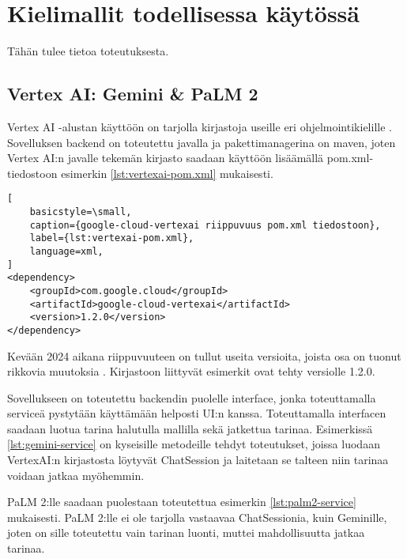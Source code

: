 \chapter{Kielimallit todellisessa käytössä}%
\label{ch:toteutus}

Tähän tulee tietoa toteutuksesta.

\section{Vertex AI: Gemini \& PaLM 2}

Vertex AI -alustan käyttöön on tarjolla kirjastoja useille eri
ohjelmointikielille \parencite{vertexAiGenerativeAiQuickstart}. Sovelluksen
backend on toteutettu javalla ja pakettimanagerina on maven, joten Vertex AI:n
javalle tekemän kirjasto saadaan käyttöön lisäämällä pom.xml-tiedostoon
esimerkin \ref{lst:vertexai-pom.xml} mukaisesti.

\begin{lstlisting}[
    basicstyle=\small,
    caption={google-cloud-vertexai riippuvuus pom.xml tiedostoon},
    label={lst:vertexai-pom.xml},
    language=xml,
]
<dependency>
    <groupId>com.google.cloud</groupId>
    <artifactId>google-cloud-vertexai</artifactId>
    <version>1.2.0</version>
</dependency>
\end{lstlisting}

Kevään 2024 aikana riippuvuuteen on tullut useita versioita, joista osa on
tuonut rikkovia muutoksia \parencite{mavenGoogleVertexAIAPI}. Kirjastoon
liittyvät esimerkit ovat tehty versiolle 1.2.0.

Sovellukseen on toteutettu backendin puolelle interface, jonka toteuttamalla
serviceä pystytään käyttämään helposti UI:n kanssa. Toteuttamalla interfacen
saadaan luotua tarina halutulla mallilla sekä jatkettua tarinaa. Esimerkissä
\ref{lst:gemini-service} on kyseisille metodeille tehdyt toteutukset, joissa
luodaan VertexAI:n kirjastosta löytyvät ChatSession ja laitetaan se talteen
niin tarinaa voidaan jatkaa myöhemmin.



PaLM 2:lle saadaan puolestaan toteutettua esimerkin \ref{lst:palm2-service}
mukaisesti. PaLM 2:lle ei ole tarjolla vastaavaa ChatSessionia, kuin Geminille,
joten on sille toteutettu vain tarinan luonti, muttei mahdollisuutta jatkaa
tarinaa.


